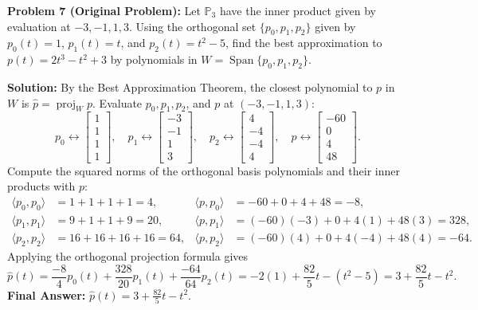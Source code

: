 \documentclass[11pt, letterpaper]{article}
\theoremstyle{definition}
\theoremstyle{remark}
\begin{document}
\medskip

\textbf{Problem 7 (Original Problem):} Let $\mathbb{P}_3$ have the inner product given by evaluation at $-3, -1, 1, 3$. Using the orthogonal set $\{p_0, p_1, p_2\}$ given by $p_0(t) = 1$, $p_1(t) = t$, and $p_2(t) = t^2 - 5$, find the best approximation to $p(t) = 2t^3 - t^2 + 3$ by polynomials in $W = \operatorname{Span}\{p_0, p_1, p_2\}$.

\textbf{Solution:} By the Best Approximation Theorem, the closest polynomial to $p$ in $W$ is $\hat{p} = \operatorname{proj}_W p$. Evaluate $p_0, p_1, p_2$, and $p$ at $(-3, -1, 1, 3)$:
\[
p_0 \leftrightarrow \begin{bmatrix} 1 \\ 1 \\ 1 \\ 1 \end{bmatrix}, \quad
p_1 \leftrightarrow \begin{bmatrix} -3 \\ -1 \\ 1 \\ 3 \end{bmatrix}, \quad
p_2 \leftrightarrow \begin{bmatrix} 4 \\ -4 \\ -4 \\ 4 \end{bmatrix}, \quad
p \leftrightarrow \begin{bmatrix} -60 \\ 0 \\ 4 \\ 48 \end{bmatrix}.
\]
Compute the squared norms of the orthogonal basis polynomials and their inner products with $p$:
\begin{align*}
\langle p_0, p_0 \rangle &= 1 + 1 + 1 + 1 = 4, & \langle p, p_0 \rangle &= -60 + 0 + 4 + 48 = -8, \\
\langle p_1, p_1 \rangle &= 9 + 1 + 1 + 9 = 20, & \langle p, p_1 \rangle &= (-60)(-3) + 0 + 4(1) + 48(3) = 328, \\
\langle p_2, p_2 \rangle &= 16 + 16 + 16 + 16 = 64, & \langle p, p_2 \rangle &= (-60)(4) + 0 + 4(-4) + 48(4) = -64.
\end{align*}
Applying the orthogonal projection formula gives
\[
\hat{p}(t) = \frac{-8}{4}p_0(t) + \frac{328}{20}p_1(t) + \frac{-64}{64}p_2(t) = -2(1) + \frac{82}{5}t - (t^2 - 5) = 3 + \frac{82}{5}t - t^2.
\]
\textbf{Final Answer:} $\hat{p}(t) = 3 + \frac{82}{5}t - t^2$.
\end{document}
